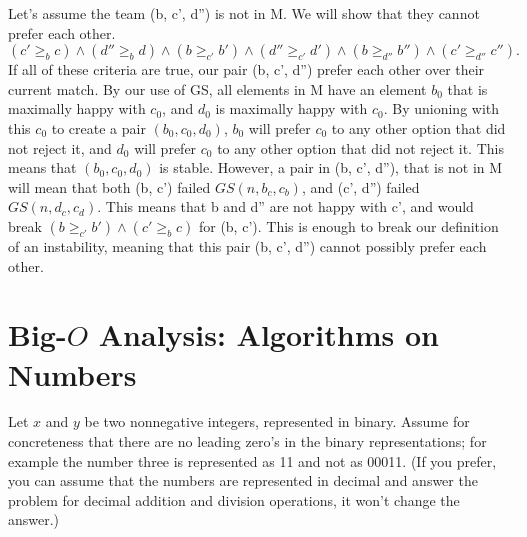 \documentclass[11pt]{article}
\begin{document}
\begin{enumerate}
\begin{soln}
    Let's assume the team (b, c', d'') is not in M. We will show that they cannot prefer each other. \\
$( c' \ge_b c ) \wedge (d'' \ge_b d) 
\wedge ( b \ge_{c'} b' ) \wedge (d'' \ge_{c'} d') 
\wedge ( b \ge_{d''} b'' ) \wedge (c' \ge_{d''} c'').$ \\
    If all of these criteria are true, our pair (b, c', d'') prefer each other over their current match.
    By our use of GS, all elements in M have an element $b_0$ that is maximally happy with $c_0$, and $d_0$ is maximally happy with $c_0$. By unioning with this $c_0$ to create a pair $(b_0, c_0, d_0)$, $b_0$ will prefer $c_0$ to any other option that did not reject it, and $d_0$ will prefer $c_0$ to any other option that did not reject it. This means that $(b_0, c_0, d_0)$ is stable. However, a pair in (b, c', d''), that is not in M will mean that both (b, c') failed $GS(n, b_c, c_b)$, and (c', d'') failed $GS(n, d_c, c_d)$. This means that b and d'' are not happy with c', and would break $( b \ge_{c'} b' ) \wedge ( c' \ge_b c )$ for (b, c'). This is enough to break our definition of an instability, meaning that this pair  (b, c', d'') cannot possibly prefer each other.
\end{soln}

\end{enumerate}

\newpage
\section{Big-$O$ Analysis: Algorithms on Numbers}
Let $x$ and $y$ be two nonnegative integers, represented in binary.
Assume for concreteness that there are no leading zero's in the
binary representations; for example the number three is
represented as 11 and not as 00011.  (If you prefer, you
can assume that the numbers are represented in decimal and answer the
problem for decimal addition and division operations, it won't
change the answer.)
\end{document}
